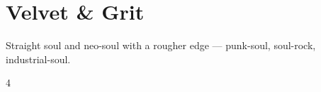 \documentclass[a4paper,landscape]{memoir}
\begin{document}
\chapter{Velvet \& Grit}
Straight soul and neo-soul with a rougher edge — punk-soul, soul-rock, industrial-soul.
\clearpage\begin{multicols*}{4}
\end{multicols*}

\appendix

\backmatter
\printindex[songs]
\clearpage
\printindex[tags]
\end{document}
